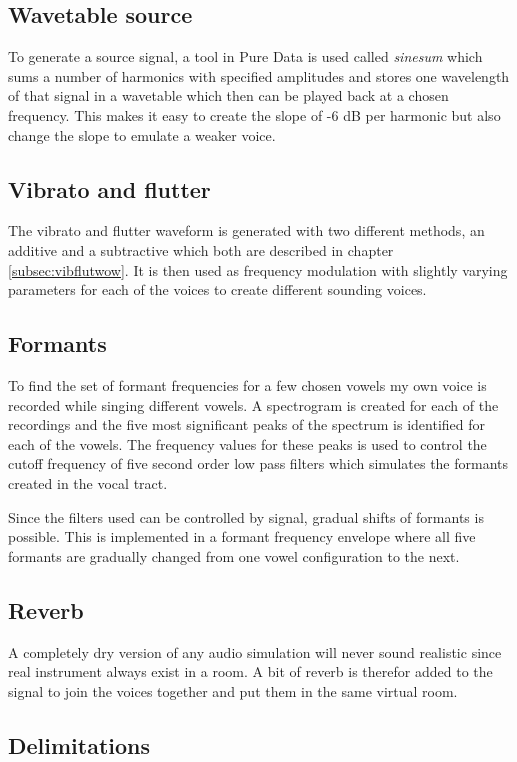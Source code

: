 \documentclass{article}
\begin{document}
\subsection{Wavetable source}
To generate a source signal, a tool in Pure Data is used called \textit{sinesum} which sums a number of harmonics with specified amplitudes and stores one wavelength of that signal in a wavetable which then can be played back at a chosen frequency. This makes it easy to create the slope of -6 dB per harmonic but also change the slope to emulate a weaker voice.

\subsection{Vibrato and flutter}
The vibrato and flutter waveform is generated with two different methods, an additive and a subtractive which both are described in chapter \ref{subsec:vibflutwow}. It is then used as frequency modulation with slightly varying parameters for each of the voices to create different sounding voices.

\subsection{Formants}
To find the set of formant frequencies for a few chosen vowels my own voice is recorded while singing different vowels. A spectrogram is created for each of the recordings and the five most significant peaks of the spectrum is identified for each of the vowels. The frequency values for these peaks is used to control the cutoff frequency of five second order low pass filters which simulates the formants created in the vocal tract.

Since the filters used can be controlled by signal, gradual shifts of formants is possible. This is implemented in a formant frequency envelope where all five formants are gradually changed from one vowel configuration to the next.

\subsection{Reverb}
A completely dry version of any audio simulation will never sound realistic since real instrument always exist in a room. A bit of reverb is therefor added to the signal to join the voices together and put them in the same virtual room.

\subsection{Delimitations}
\end{document}
